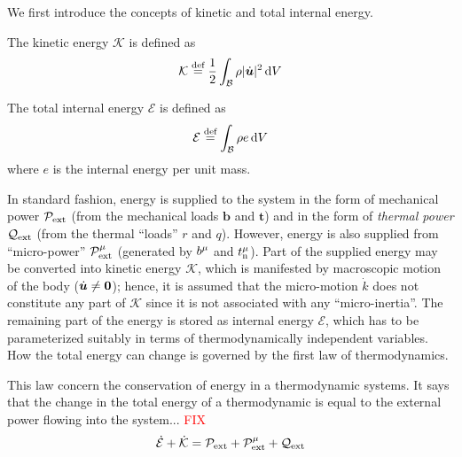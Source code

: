 We first introduce the concepts of kinetic and total internal energy.
\begin{definition}\label{def:KE}
The kinetic energy ${\mathcal K}$ is defined as
\begin{equation}
  \mathcal{K} \defeq \frac{1}{2} \vint{ \rho | \dot{\bm {u}} | ^2}
\label{eq:vol_I_ch02_eq14}
\end{equation}
\end{definition}

\begin{definition}\label{def:IE}
The total internal energy $\mathcal{E}$ is defined as
\begin{equation}
   {\mathcal{E}} \defeq \vint{\rho e}
\label{eq:vol_I_ch02_eq15}
\end{equation}
where $e$ is the internal energy per unit mass.
\end{definition}


In standard fashion, energy is supplied to the system in the form of
mechanical power $\mechpow$ (from the mechanical loads
${\bm b}$ and ${\bm t}$) and in the form of {\em thermal power} 
$\thermpow$ (from the thermal ``loads'' $r$ and $q$).
However, energy is also supplied from ``micro-power''
$\micpow$ (generated by $b^\micro$ and $\microtract$).
Part of the supplied energy may be converted into kinetic
energy ${\mathcal K}$, which is manifested by macroscopic motion of the
body ($\udot \neq \bm{0}$); hence, it is assumed that the micro-motion 
$\dot{k}$ does not constitute any part of ${\mathcal K}$ since it is not
 associated with any ``micro-inertia''. 
The remaining part of the energy is
stored as internal energy ${\mathcal E}$, which has to be
parameterized suitably in terms of thermodynamically independent variables.
How the total energy can change is governed by the first law of thermodynamics.
\begin{physlaw} 
This law concern the conservation 
of energy in a thermodynamic systems. It says that the change in the total 
energy of a thermodynamic is equal to the external power flowing into the 
system... \textcolor{red}{FIX}
\begin{equation}
  \mathcal{\dot{E}} + \mathcal{\dot{K}} = \mechpow + \micpow + \thermpow
\label{eq:vol_I_ch02_eq18}
\end{equation}
\end{physlaw}

